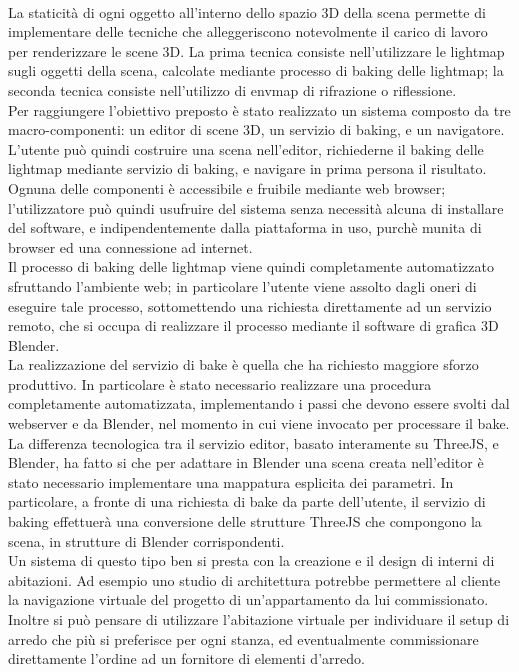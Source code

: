 \\
La staticità di ogni oggetto all’interno dello spazio 3D della scena permette di implementare delle tecniche che alleggeriscono notevolmente il carico di lavoro per renderizzare le scene 3D.
La prima tecnica consiste nell’utilizzare le lightmap sugli oggetti della scena, calcolate mediante processo di baking delle lightmap; la seconda tecnica consiste nell’utilizzo di envmap di rifrazione o riflessione. 
\\
Per raggiungere l'obiettivo preposto è stato realizzato un sistema composto da tre macro-componenti: un editor di scene 3D, un servizio di baking, e un navigatore.
L'utente può quindi costruire una scena nell'editor, richiederne il baking delle lightmap mediante servizio di baking, e navigare in prima persona il risultato. Ognuna delle componenti è accessibile e fruibile mediante web browser; l'utilizzatore può quindi usufruire del sistema senza necessità alcuna di installare del software, e indipendentemente dalla piattaforma in uso, purchè munita di browser ed una connessione ad internet.
\\
Il processo di baking delle lightmap viene quindi completamente automatizzato sfruttando l'ambiente web; in particolare l'utente viene assolto dagli oneri di eseguire tale processo, sottomettendo una richiesta direttamente ad un servizio remoto, che si occupa di realizzare il processo mediante il software di grafica 3D Blender. 
\\
La realizzazione del servizio di bake è quella che ha richiesto maggiore sforzo produttivo. In particolare è stato necessario realizzare una procedura completamente automatizzata, implementando i passi che devono essere svolti dal webserver e da Blender, nel momento in cui viene invocato per processare il bake.
\\
La differenza tecnologica tra il servizio editor, basato interamente su ThreeJS, e Blender, ha fatto si che per adattare in Blender una scena creata nell’editor è stato necessario implementare una mappatura esplicita dei parametri. In particolare, a fronte di una richiesta di bake da parte dell’utente, il servizio di baking effettuerà una conversione delle strutture ThreeJS che compongono la scena, in strutture di Blender corrispondenti. 
\\
Un sistema di questo tipo ben si presta con la creazione e il design di interni di abitazioni. Ad esempio uno studio di architettura potrebbe permettere al cliente la navigazione virtuale del progetto di un’appartamento da lui commissionato. Inoltre si può pensare di utilizzare l'abitazione virtuale per individuare il setup di arredo che più si preferisce per ogni stanza, ed eventualmente commissionare direttamente l'ordine ad un fornitore di elementi d'arredo.

